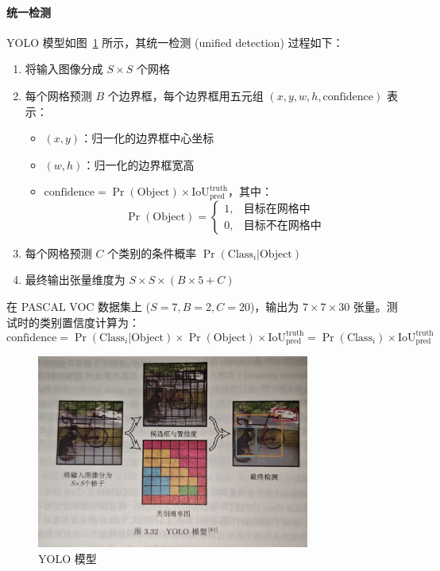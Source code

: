 \documentclass[12pt, a4paper]{article}
\begin{document}
\paragraph{统一检测}
YOLO 模型如图~\ref{fig:yolo_model} 所示，其统一检测 (unified detection) 过程如下：
\begin{enumerate}
    \item 将输入图像分成 \( S \times S \) 个网格
    \item 每个网格预测 \( B \) 个边界框，每个边界框用五元组 \((x, y, w, h, \text{confidence})\) 表示：
    \begin{itemize}
        \item \((x, y)\)：归一化的边界框中心坐标
        \item \((w, h)\)：归一化的边界框宽高
        \item \(\text{confidence} = \Pr(\text{Object}) \times \text{IoU}_{\text{pred}}^{\text{truth}}\)，其中：
        \[
        \Pr(\text{Object}) = 
        \begin{cases} 
        1, & \text{目标在网格中} \\
        0, & \text{目标不在网格中}
        \end{cases}
        \]
    \end{itemize}
    \item 每个网格预测 \(C\) 个类别的条件概率 \(\Pr(\text{Class}_i | \text{Object})\)
    \item 最终输出张量维度为 \( S \times S \times (B \times 5 + C) \)
\end{enumerate}
在 PASCAL VOC 数据集上 (\(S=7, B=2, C=20\))，输出为 \(7 \times 7 \times 30\) 张量。测试时的类别置信度计算为：
\begin{equation}
\text{confidence} = \Pr(\text{Class}_i | \text{Object}) \times \Pr(\text{Object}) \times \text{IoU}_{\text{pred}}^{\text{truth}} = \Pr(\text{Class}_i) \times \text{IoU}_{\text{pred}}^{\text{truth}}
\end{equation}

\begin{figure}[htbp]
    \centering
    \includegraphics[width=0.8\textwidth]{image/yolomoxing.jpg} %
    \caption{YOLO 模型~}
    \label{fig:yolo_model}
\end{figure}
\end{document}
